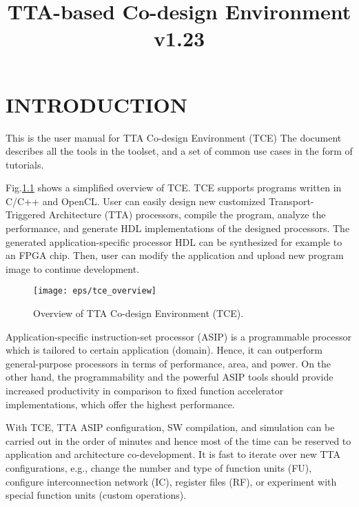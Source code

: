\documentclass[twoside]{tceusermanual}
\begin{document}
\title{TTA-based Co-design Environment v1.23}
\maketitle

\tableofcontents

\chapter{INTRODUCTION}

This is the user manual for TTA Co-design Environment (TCE)
\cite{tcewww}
The document describes all the tools in the toolset, and a set of common use
cases in the form of tutorials.

Fig.\ref{fig:tce_overview} shows a simplified overview of TCE. TCE supports
programs written in C/C++ and OpenCL. User can easily design new customized
Transport-Triggered Architecture (TTA) processors, compile the program,
analyze the performance, and generate HDL implementations of the designed
processors. The generated application-specific processor HDL can be
synthesized for example to an FPGA chip. Then, user can modify the
application and upload new program image to continue development.

\begin{figure}
  \begin{center}
    \texttt{[image: eps/tce\_overview]}
    \caption{Overview of TTA Co-design Environment (TCE).}
    \label{fig:tce_overview}
  \end{center}
\end{figure}

Application-specific instruction-set processor (ASIP) is a
programmable processor which is tailored to certain application
(domain). Hence, it can outperform general-purpose processors in terms
of performance, area, and power. On the other hand, the programmability
and the powerful ASIP tools should provide increased productivity in
comparison to fixed function accelerator implementations, which offer the
highest performance.

With TCE, TTA ASIP configuration, SW compilation, and simulation can
be carried out in the order of minutes and hence most of the time can
be reserved to application and architecture co-development. It is fast
to iterate over new TTA configurations, e.g., change the number and
type of function units (FU), configure interconnection network (IC),
register files (RF), or experiment with special function units
(custom operations). 
\end{document}
